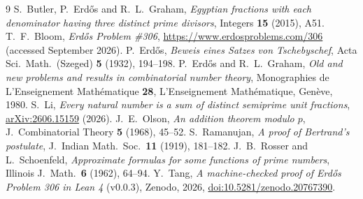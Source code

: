 \documentclass[11pt]{amsart}
\theoremstyle{definition}
\theoremstyle{remark}
\begin{document}
\begin{thebibliography}{9}
 S.~Butler, P.~Erd\H{o}s and R.~L.~Graham, \emph{Egyptian fractions with each denominator having three distinct prime divisors}, Integers \textbf{15} (2015), A51.
 T.~F.~Bloom, \emph{Erd\H{o}s Problem \#306}, \url{https://www.erdosproblems.com/306} (accessed September 2026).
 P.~Erd\H{o}s, \emph{Beweis eines Satzes von Tschebyschef}, Acta Sci.\ Math.\ (Szeged) \textbf{5} (1932), 194--198.
 P.~Erd\H{o}s and R.~L.~Graham, \emph{Old and new problems and results in combinatorial number theory}, Monographies de L'Enseignement Math\'ematique \textbf{28}, L'Enseignement Math\'ematique, Gen\`eve, 1980.
 S.~Li, \emph{Every natural number is a sum of distinct semiprime unit fractions}, \href{https://arxiv.org/abs/2606.15159}{arXiv:2606.15159} (2026).
 J.~E.~Olson, \emph{An addition theorem modulo $p$}, J.\ Combinatorial Theory \textbf{5} (1968), 45--52.
 S.~Ramanujan, \emph{A proof of Bertrand's postulate}, J.\ Indian Math.\ Soc.\ \textbf{11} (1919), 181--182.
 J.~B.~Rosser and L.~Schoenfeld, \emph{Approximate formulas for some functions of prime numbers}, Illinois J.\ Math.\ \textbf{6} (1962), 64--94.
 Y.~Tang, \emph{A machine-checked proof of Erd\H{o}s Problem 306 in Lean 4} (v0.0.3), Zenodo, 2026, \href{https://doi.org/10.5281/zenodo.20767390}{doi:10.5281/zenodo.20767390}.
\end{thebibliography}
\end{document}
